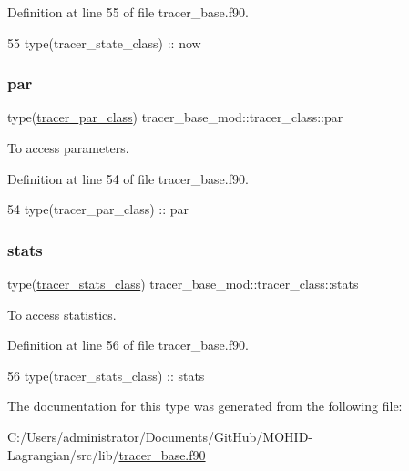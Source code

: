 Definition at line 55 of file tracer\+\_\+base.\+f90.


\begin{DoxyCode}
55         \textcolor{keywordtype}{type}(tracer\_state\_class) :: now
\end{DoxyCode}
\mbox{\label{structtracer__base__mod_1_1tracer__class_abadf1c607905330dc05f8985f6487a41}} 
\subsubsection{\texorpdfstring{par}{par}}
{\footnotesize\ttfamily type(\mbox{\hyperlink{structtracer__base__mod_1_1tracer__par__class}{tracer\+\_\+par\+\_\+class}}) tracer\+\_\+base\+\_\+mod\+::tracer\+\_\+class\+::par\hspace{0.3cm}{\ttfamily [private]}}



To access parameters. 



Definition at line 54 of file tracer\+\_\+base.\+f90.


\begin{DoxyCode}
54         \textcolor{keywordtype}{type}(tracer\_par\_class)   :: par
\end{DoxyCode}
\mbox{\label{structtracer__base__mod_1_1tracer__class_a688d74f9059a50eba8fdd536c2f79876}} 
\subsubsection{\texorpdfstring{stats}{stats}}
{\footnotesize\ttfamily type(\mbox{\hyperlink{structtracer__base__mod_1_1tracer__stats__class}{tracer\+\_\+stats\+\_\+class}}) tracer\+\_\+base\+\_\+mod\+::tracer\+\_\+class\+::stats\hspace{0.3cm}{\ttfamily [private]}}



To access statistics. 



Definition at line 56 of file tracer\+\_\+base.\+f90.


\begin{DoxyCode}
56         \textcolor{keywordtype}{type}(tracer\_stats\_class) :: stats
\end{DoxyCode}


The documentation for this type was generated from the following file\+:\begin{DoxyCompactItemize}
\item 
C\+:/\+Users/administrator/\+Documents/\+Git\+Hub/\+M\+O\+H\+I\+D-\/\+Lagrangian/src/lib/\mbox{\hyperlink{tracer__base_8f90}{tracer\+\_\+base.\+f90}}\end{DoxyCompactItemize}
